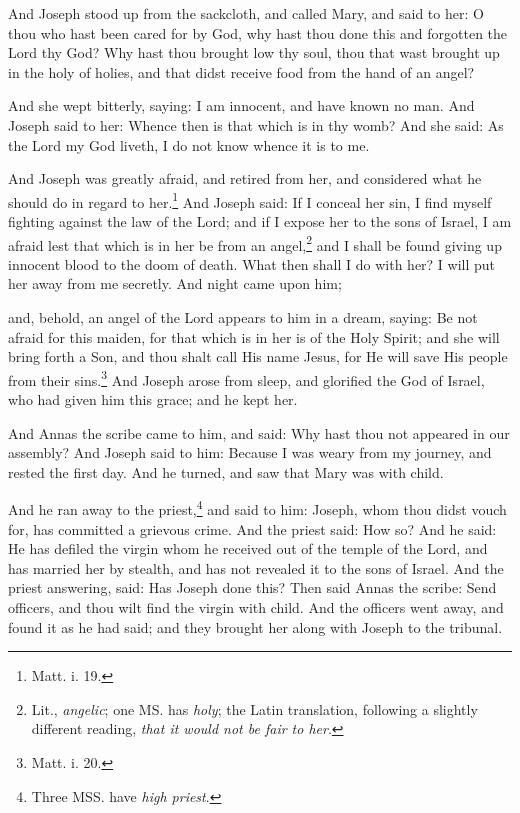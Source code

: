 \pend\pstart
And Joseph stood up from the sackcloth, and called Mary, and said to her: O thou who hast been cared for by God, why hast thou done this and forgotten the Lord thy God? Why hast thou brought low thy soul, thou that wast brought up in the holy of holies, and that didst receive food from the hand of an angel?

\pend\pstart
And she wept bitterly, saying: I am innocent, and have known no man. And Joseph said to her: Whence then is that which is in thy womb? And she said: As the Lord my God liveth, I do not know whence it is to me.

\pend\pstart
{}

\pend\pstart
And Joseph was greatly afraid, and retired from her, and considered what he should do in regard to her.\footnote{Matt. i. 19.} And Joseph said: If I conceal her sin, I find myself fighting against the law of the Lord; and if I expose her to the sons of Israel, I am afraid lest that which is in her be from an angel,\footnote{Lit., \textit{angelic}; one MS. has \textit{holy}; the Latin translation, following a slightly different reading, \textit{that it would not be fair to her}.} and I shall be found giving up innocent blood to the doom of death. What then shall I do with her? I will put her away from me secretly. And night came upon him;

\pend\pstart
and, behold, an angel of the Lord appears to him in a dream, saying: Be not afraid for this maiden, for that which is in her is of the Holy Spirit; and she will bring forth a Son, and thou shalt call His name Jesus, for He will save His people from their sins.\footnote{Matt. i. 20.} And Joseph arose from sleep, and glorified the God of Israel, who had given him this grace; and he kept her.

\pend\pstart
{}

\pend\pstart
And Annas the scribe came to him, and said: Why hast thou not appeared in our assembly? And Joseph said to him: Because I was weary from my journey, and rested the first day. And he turned, and saw that Mary was with child.

\pend\pstart
And he ran away to the priest,\footnote{Three MSS. have \textit{high priest}.} and said to him: Joseph, whom thou didst vouch for, has committed a grievous crime. And the priest said: How so? And he said: He has defiled the virgin whom he received out of the temple of the Lord, and has married her by stealth, and has not revealed it to the sons of Israel. And the priest answering, said: Has Joseph done this? Then said Annas the scribe: Send officers, and thou wilt find the virgin with child. And the officers went away, and found it as he had said; and they brought her along with Joseph to the tribunal.

